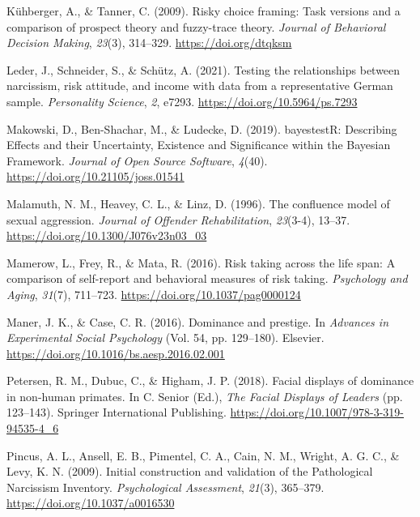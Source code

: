 \documentclass[
  donotrepeattitle,doc, 12pt, a4paper,floatsintext]{apa7}
\newlength{\cslhangindent}
\newlength{\cslentryspacingunit} %
\newenvironment{CSLReferences}[2] %
 {%
  \setlength{\parindent}{0pt}
  \ifodd #1
  \let\oldpar\par
  \def\par{\hangindent=\cslhangindent\oldpar}
  \fi
  \setlength{\parskip}{#2\cslentryspacingunit}
 }%
 {}
\begin{document}
\begin{CSLReferences}{1}{0}
\leavevmode{}%
Kühberger, A., \& Tanner, C. (2009). Risky choice framing: Task versions and a comparison of prospect theory and fuzzy-trace theory. \emph{Journal of Behavioral Decision Making}, \emph{23}(3), 314--329. \url{https://doi.org/dtqksm}

\leavevmode{}%
Leder, J., Schneider, S., \& Schütz, A. (2021). Testing the relationships between narcissism, risk attitude, and income with data from a representative {German} sample. \emph{Personality Science}, \emph{2}, e7293. \url{https://doi.org/10.5964/ps.7293}

\leavevmode{}%
Makowski, D., Ben-Shachar, M., \& Ludecke, D. (2019). {bayestestR}: {Describing Effects} and their {Uncertainty}, {Existence} and {Significance} within the {Bayesian Framework}. \emph{Journal of Open Source Software}, \emph{4}(40). \url{https://doi.org/10.21105/joss.01541}

\leavevmode{}%
Malamuth, N. M., Heavey, C. L., \& Linz, D. (1996). The confluence model of sexual aggression. \emph{Journal of Offender Rehabilitation}, \emph{23}(3-4), 13--37. \url{https://doi.org/10.1300/J076v23n03_03}

\leavevmode{}%
Mamerow, L., Frey, R., \& Mata, R. (2016). Risk taking across the life span: {A} comparison of self-report and behavioral measures of risk taking. \emph{Psychology and Aging}, \emph{31}(7), 711--723. \url{https://doi.org/10.1037/pag0000124}

\leavevmode{}%
Maner, J. K., \& Case, C. R. (2016). Dominance and prestige. In \emph{Advances in {Experimental Social Psychology}} (Vol. 54, pp. 129--180). {Elsevier}. \url{https://doi.org/10.1016/bs.aesp.2016.02.001}

\leavevmode{}%
Petersen, R. M., Dubuc, C., \& Higham, J. P. (2018). Facial displays of dominance in non-human primates. In C. Senior (Ed.), \emph{The {Facial Displays} of {Leaders}} (pp. 123--143). {Springer International Publishing}. \url{https://doi.org/10.1007/978-3-319-94535-4_6}

\leavevmode{}%
Pincus, A. L., Ansell, E. B., Pimentel, C. A., Cain, N. M., Wright, A. G. C., \& Levy, K. N. (2009). Initial construction and validation of the {Pathological Narcissism Inventory}. \emph{Psychological Assessment}, \emph{21}(3), 365--379. \url{https://doi.org/10.1037/a0016530}


\end{CSLReferences}
\end{document}
